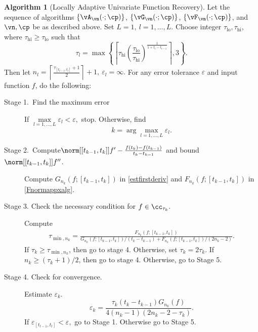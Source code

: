 \documentclass[]{elsarticle}
\DeclareMathOperator{\lo}{lo}
\DeclareMathOperator{\err}{err}
\theoremstyle{definition}
\newtheorem{algo}{Algorithm}
\theoremstyle{remark}
\begin{document}


\begin{algo}[Locally Adaptive Univariate Function Recovery] \label{multistageapproalgo}
Let the sequence of algorithms $\{\vA_{\vn}(\cdot;\cp)\}$, $\{\vG_{\vn}(\cdot;\cp)\}$,  $\{\vF_{\vn}(\cdot;\cp)\}$, and $\vn, \cp$  be as described above. Set $L=1, \ l =1,\ldots,L$.
Choose integer $\tau_{\lo}, \tau_{\text{hi}}$, where $\tau_{\text{hi}} \ge \tau_{\lo}$ such that
$$\tau_l = \max\left\{ \left\lceil \tau_{\text{hi}} \left(\frac{\tau_{\lo}}{\tau_{\text{hi}}}\right)^{\frac{1}{1+t_i-t_{i-1}}} \right\rceil ,3\right\}.$$
Then let $n_l= \left\lceil\frac{\tau_{[t_{l-1},t_l]}+1}{2}  \right\rceil+1, \ \varepsilon_l=\infty.$ For any error tolerance $\varepsilon$ and input function $f$, do the following:
\begin{description}
\item[Stage 1.\ Find the maximum error] If $\max\limits_{l=1,\ldots,L}\varepsilon_l < \varepsilon,$ stop.
Otherwise, find
$$k = \arg\max\limits_{l=1,\ldots,L}\varepsilon_l.$$
\item[Stage 2.\ Compute{$\norm[{[t_{k-1},t_k]}]{f'-\frac{f(t_k)-f(t_{k-1})}{t_k-t_{k-1}}}$} and bound {$\norm[{[t_{k-1},t_k]}]{f''}$}.] Compute $G_{n_k}(f;{[t_{k-1},t_k]})$ in \eqref{estfirstderiv} and $F_{n_k}(f;{[t_{k-1},t_k]})$ in \eqref{Fnormappxalg}.
\item[Stage 3. Check the necessary condition for $f \in \cc_{\tau_k}$.] Compute
    \begin{align*}
     \tau_{\min,n_k} =  \frac{F_{n_k}(f;{[t_{k-1},t_k]})}{G_{n_k}(f;{[t_{k-1},t_k]})/(t_k-t_{k-1})+F_{n_k}(f;{[t_{k-1},t_k]})/(2n_k-2)}.
    \end{align*}
If $\tau_k \ge \tau_{\min,n_k}$, then go to stage 4.  Otherwise, set $\tau_k = 2\tau_k$.  If $n_k \ge (\tau_k+1)/2$, then go to stage 4.  Otherwise, go to Stage 5.
\item[Stage 4. Check for convergence.] Estimate $\varepsilon_k.$
$$\varepsilon_k=\frac{\tau_k(t_k-t_{k-1})G_{n_k}(f)}{4(n_k-1)(2n_k-2 - \tau_k)}.$$
If $\varepsilon_{[t_{l-1},t_l]} < \varepsilon ,$ go to Stage 1. Otherwise go to Stage 5.

\end{description}
\end{algo}
\end{document}
